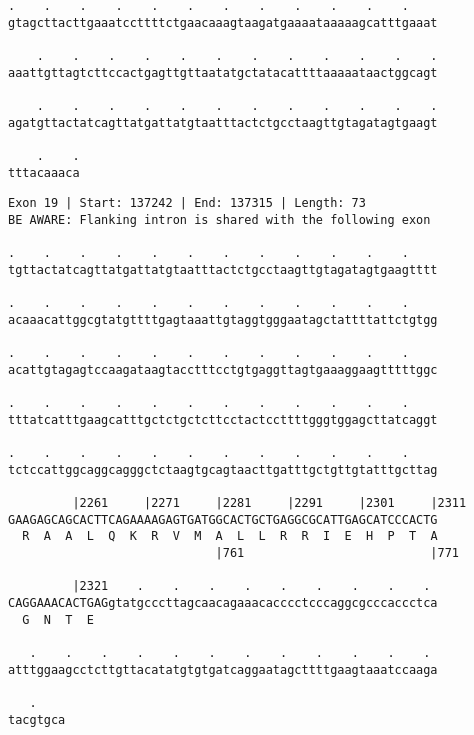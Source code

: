 \documentclass{article}
\begin{document}
\newpage
\begin{Verbatim}[fontfamily=courier]
    .    .    .    .    .    .    .    .    .    .    .    .
gtagcttacttgaaatccttttctgaacaaagtaagatgaaaataaaaagcatttgaaat

    .    .    .    .    .    .    .    .    .    .    .    .
aaattgttagtcttccactgagttgttaatatgctatacattttaaaaataactggcagt

    .    .    .    .    .    .    .    .    .    .    .    .
agatgttactatcagttatgattatgtaatttactctgcctaagttgtagatagtgaagt

    .    .
tttacaaaca
\end{Verbatim}
\newpage
\begin{Verbatim}[fontfamily=courier]
Exon 19 | Start: 137242 | End: 137315 | Length: 73
BE AWARE: Flanking intron is shared with the following exon

.    .    .    .    .    .    .    .    .    .    .    .    
tgttactatcagttatgattatgtaatttactctgcctaagttgtagatagtgaagtttt

.    .    .    .    .    .    .    .    .    .    .    .    
acaaacattggcgtatgttttgagtaaattgtaggtgggaatagctattttattctgtgg

.    .    .    .    .    .    .    .    .    .    .    .    
acattgtagagtccaagataagtacctttcctgtgaggttagtgaaaggaagtttttggc

.    .    .    .    .    .    .    .    .    .    .    .    
tttatcatttgaagcatttgctctgctcttcctactccttttgggtggagcttatcaggt

.    .    .    .    .    .    .    .    .    .    .    .    
tctccattggcaggcagggctctaagtgcagtaacttgatttgctgttgtatttgcttag

         |2261     |2271     |2281     |2291     |2301     |2311
GAAGAGCAGCACTTCAGAAAAGAGTGATGGCACTGCTGAGGCGCATTGAGCATCCCACTG
  R  A  A  L  Q  K  R  V  M  A  L  L  R  R  I  E  H  P  T  A
                             |761                          |771

         |2321    .    .    .    .    .    .    .    .    . 
CAGGAAACACTGAGgtatgcccttagcaacagaaacacccctcccaggcgcccaccctca
  G  N  T  E                                                

   .    .    .    .    .    .    .    .    .    .    .    . 
atttggaagcctcttgttacatatgtgtgatcaggaatagcttttgaagtaaatccaaga

   .    
tacgtgca
\end{Verbatim}
\newpage
\end{document}
